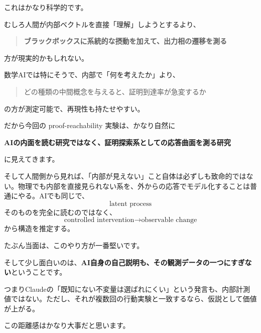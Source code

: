 \documentclass[11pt,a4paper]{article}
\begin{document}
これはかなり科学的です。

むしろ人間が内部ベクトルを直接「理解」しようとするより、
\begin{quote}
\textbf{ブラックボックスに系統的な摂動を加えて、出力相の遷移を測る}
\end{quote}
方が現実的かもしれない。

数学AIでは特にそうで、内部で「何を考えたか」より、
\begin{quote}
どの種類の中間概念を与えると、証明到達率が急変するか
\end{quote}
の方が測定可能で、再現性も持たせやすい。

だから今回の proof-reachability 実験は、かなり自然に

\textbf{AIの内面を読む研究ではなく、証明探索系としての応答曲面を測る研究}

に見えてきます。

そして人間側から見れば、「内部が見えない」こと自体は必ずしも致命的ではない。物理でも内部を直接見られない系を、外からの応答でモデル化することは普通にやる。AIでも同じで、
\[
\text{latent process}
\]
そのものを完全に読むのではなく、
\[
\text{controlled intervention}
\to
\text{observable change}
\]
から構造を推定する。

たぶん当面は、このやり方が一番堅いです。

そして少し面白いのは、\textbf{AI自身の自己説明も、その観測データの一つにすぎない}ということです。

つまりClaudeの「既知にない不変量は選ばれにくい」という発言も、内部計測値ではない。ただし、それが複数回の行動実験と一致するなら、仮説として価値が上がる。

この距離感はかなり大事だと思います。
\end{document}
